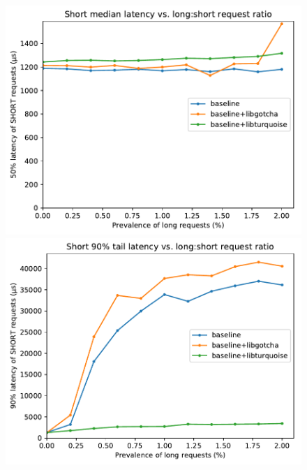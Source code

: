 \begin{figure}[t]
	\begin{minipage}{\columnwidth}
	\includegraphics[width=\textwidth]{figs/twooom_50-short}
	\end{minipage}
%
	\begin{minipage}{\columnwidth}
	\includegraphics[width=\textwidth]{figs/twooom_90-short}
	\end{minipage}


\end{figure}
